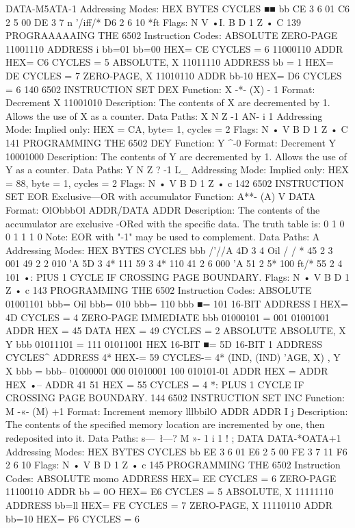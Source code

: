 DATA-M5ATA-1
Addressing Modes:
HEX
BYTES
CYCLES
■■ bb
CE
3
6
01
C6
2
5
00
DE
3
7
n
'/iff/*
D6
2
6
10
*ft
Flags:
N V
•I.
B D 1 Z
•
C
139
PROGRAAAAAING THE 6502
Instruction Codes:
ABSOLUTE
ZERO-PAGE
11001110 ADDRESS
i
bb=01
bb=00
HEX= CE CYCLES = 6
11000110 ADDR
HEX= C6 CYCLES = 5
ABSOLUTE, X 11011110 ADDRESS
bb = 1 HEX= DE CYCLES = 7
ZERO-PAGE, X 11010110 ADDR
bb-10 HEX= D6 CYCLES = 6
140
6502 INSTRUCTION SET
DEX
Function:
X -*- (X) - 1
Format:
Decrement X
11001010
Description:
The contents of X are decremented by 1. Allows the use of X as
a counter.
Data Paths:
X
N
Z
-1
AN-
i
1
Addressing Mode:
Implied only:
HEX = CA, byte= 1, cycles = 2
Flags:
N
•
V B D 1 Z
•
C
141
PROGRAMMING THE 6502
DEY
Function:
Y ^-0
Format:
Decrement Y
10001000
Description:
The contents of Y are decremented by 1. Allows the use of Y as
a counter.
Data Paths:
Y
N
Z
{}?
-1
L_
Addressing Mode:
Implied only:
HEX = 88, byte = 1, cycles = 2
Flags:
N
•
V B D 1 Z
•
c
142
6502 INSTRUCTION SET
EOR Exclusive—OR with accumulator
Function:
A**- (A) V DATA
Format:
OlObbbOl ADDR/DATA ADDR
Description:
The contents of the accumulator are exclusive -ORed with the
specific data. The truth table is:
0
1
0
0
1
1
1
0
Note: EOR with "-1" may be used to complement.
Data Paths: A
Addressing Modes:
HEX
BYTES
CYCLES
bbb
/'//A
4D
3
4
Oil
/ / *
45
2
3
001
49
2
2
010
'A
5D
3
4*
111
59
3
4*
110
41
2
6
000
'A
51
2
5*
100
ft/*
55
2
4
101
•: PIUS 1 CYCLE IF CROSSING PAGE BOUNDARY.
Flags:
N
•
V B D 1 Z
•
c
143
PROGRAMMING THE 6502
Instruction Codes:
ABSOLUTE 01001101
bbb= Oil
bbb= 010
bbb= 110
bbb ■= 101
16-BIT ADDRESS
I
HEX= 4D CYCLES = 4
ZERO-PAGE
IMMEDIATE
bbb
01000101
= 001
01001001
ADDR
HEX = 45
DATA
HEX = 49 CYCLES = 2
ABSOLUTE
ABSOLUTE,
X
Y
bbb
01011101
= 111
01011001
HEX
16-BIT
■= 5D
16-BIT
1
ADDRESS
CYCLES^
ADDRESS
4*
HEX-= 59 CYCLES-= 4*
(IND,
(IND)
'AGE,
X)
, Y
X
bbb =
bbb--
01000001
000
01010001
100
010101-01
ADDR
HEX =
ADDR
HEX •--
ADDR
41
51
HEX = 55 CYCLES = 4
*: PLUS 1 CYCLE IF CROSSING PAGE BOUNDARY.
144
6502 INSTRUCTION SET
INC
Function:
M -«- (M) +1
Format:
Increment memory
lllbbilO ADDR ADDR I
j
Description:
The contents of the specified memory location are incremented
by one, then redeposited into it.
Data Paths:
s—\
\l—?
M »-
1
i 1
! ;
DATA DATA-*OATA+1
Addressing Modes:
HEX
BYTES
CYCLES
bb
EE
3
6
01
E6
2
5
00
FE
3
7
11
F6
2
6
10
Flags:
N
•
V B D 1 Z
•
c
145
PROGRAMMING THE 6502
Instruction Codes:
ABSOLUTE momo ADDRESS
HEX= EE CYCLES = 6
ZERO-PAGE 11100110 ADDR
bb = 0O HEX= E6 CYCLES = 5
ABSOLUTE, X 11111110 ADDRESS
bb=ll HEX= FE CYCLES = 7
ZERO-PAGE, X 11110110 ADDR
bb=10 HEX= F6 CYCLES = 6
